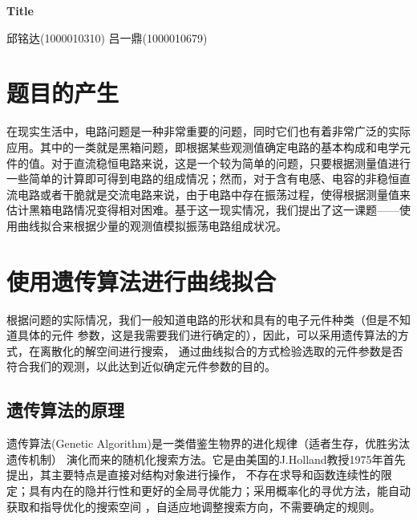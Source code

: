 \documentclass[a4paper]{article}
\begin{document}

%
%
\begin{center}
	\Huge \textbf{Title}
\end{center}
\vspace{1 in}
\begin{center}
	\normalsize 邱铭达(1000010310) 吕一鼎(1000010679)
\end{center}
\newpage


\tableofcontents


\section{题目的产生}
在现实生活中，电路问题是一种非常重要的问题，同时它们也有着非常广泛的实际应用。其中的一类就是黑箱问题，即根据某些观测值确定电路的基本构成和电学元件的值。对于直流稳恒电路来说，这是一个较为简单的问题，只要根据测量值进行一些简单的计算即可得到电路的组成情况；然而，对于含有电感、电容的非稳恒直流电路或者干脆就是交流电路来说，由于电路中存在振荡过程，使得根据测量值来估计黑箱电路情况变得相对困难。基于这一现实情况，我们提出了这一课题——使用曲线拟合来根据少量的观测值模拟振荡电路组成状况。
%
\section{使用遗传算法进行曲线拟合}

根据问题的实际情况，我们一般知道电路的形状和具有的电子元件种类（但是不知道具体的元件
参数，这是我需要我们进行确定的），因此，可以采用遗传算法的方式，在离散化的解空间进行搜索，
通过曲线拟合的方式检验选取的元件参数是否符合我们的观测，以此达到近似确定元件参数的目的。

\subsection{遗传算法的原理}

遗传算法(Genetic Algorithm)是一类借鉴生物界的进化规律（适者生存，优胜劣汰遗传机制）
演化而来的随机化搜索方法。它是由美国的J.Holland教授1975年首先提出，其主要特点是直接对结构对象进行操作，
不存在求导和函数连续性的限定；具有内在的隐并行性和更好的全局寻优能力；采用概率化的寻优方法，能自动获取和指导优化的搜索空间
，自适应地调整搜索方向，不需要确定的规则。
\end{document}
